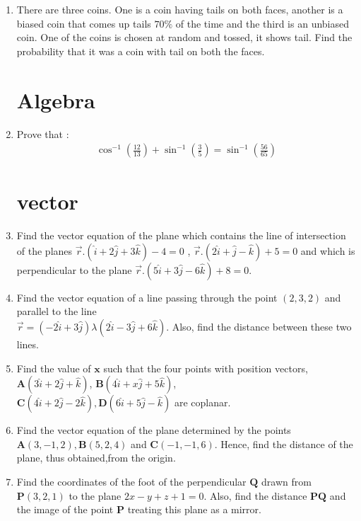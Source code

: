 \documentclass[10pt,-letter paper]{article}
\let\vec\mathbf{}
\let\vec\mathbf{}
\let\vec\mathbf{}
\providecommand{\brak}[1]{\ensuremath{\left(#1\right)}}
\begin{document}
\begin{enumerate}
\item There are three coins. One is a coin having tails on both faces, another is a biased coin that comes up tails $70\%$ of the time and the third is an unbiased coin. One of the coins is chosen at random and tossed, it shows tail. Find the probability that it was a coin with tail on both the faces.

\section{Algebra}
\item Prove that :
\begin{align*}
\cos^{-1}\brak{\frac{12}{13}}+\sin^{-1}\brak{\frac{3}{5}}=\sin^{-1} \brak{\frac{56}{65}}
\end{align*}

\section{vector}
\item Find the vector equation of the plane which contains the line of intersection of the planes 
$ \overrightarrow{r}.\brak{\hat{i} + 2\hat{j}+3\hat{k}}-4=0$ , $\overrightarrow{r}.
\brak{2\hat{i} + \hat{j} - \hat{k}}+5=0$ and which is perpendicular to the plane $\overrightarrow{r}.\brak{5\hat{i} + 3\hat{j} - 6\hat{k}}+8=0$.

\item Find the vector equation of a line passing through the point
$\brak{2, 3, 2}$ and parallel to the line\\
$\overrightarrow{r}=\brak{-2\hat{i} +3\hat{j}}\lambda\brak{2\hat{i} - 3\hat{j}+6\hat{k}}$.
Also, find the distance between these two lines.

\item Find the value of $\vec{x}$ such that the four points with position vectors,
$\vec{A}\brak{3\hat{i} + 2\hat{j} + \hat{k}}$, $\vec{B}\brak{4\hat{i} + x\hat{j} + 5\hat{k}}$,\\$\vec{C}\brak{4\hat{i} + 2\hat{j} -2 \hat{k}}, \vec{D}\brak{6\hat{i} + 5\hat{j} - \hat{k}}$ are coplanar.

\item Find the vector equation of the plane determined by the points $\vec{A}\brak{3, -1, 2}, \vec{B}\brak{5, 2, 4}$ and $\vec{C}\brak{-1, -1, 6}$. Hence, find the distance of the plane, thus obtained,from the origin.

\item Find the coordinates of the foot of the perpendicular $\vec{Q}$ drawn from $\vec{P}\brak{3, 2, 1}$ to the plane $2x - y + z + 1 = 0$. Also, find the distance $\vec{P}\vec{Q}$ and the image of the point $\vec{P}$ treating this plane as a mirror.


\end{enumerate}
\end{document}
